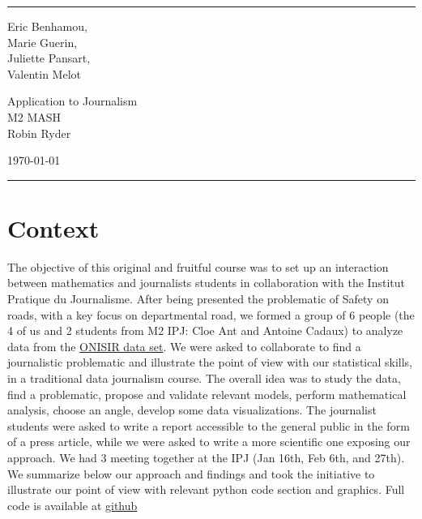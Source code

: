 \documentclass[a4paper]{article}
\theoremstyle{definition}
\theoremstyle{proposition}
\begin{document}

\fancyhead[C]{}
\hrule \medskip %
\begin{minipage}{0.295\textwidth} 
\raggedright
\footnotesize
Eric Benhamou, \hfill\\   
Marie Guerin, \hfill\\   
Juliette Pansart, \hfill\\
Valentin Melot  \hfill\\
\end{minipage}
\begin{minipage}{0.4\textwidth} 
\centering 
\large 
Application to Journalism\\ 
\normalsize 
M2 MASH \\ 
Robin Ryder
\end{minipage}
\begin{minipage}{0.295\textwidth} 
\raggedleft
\today\hfill\\
\end{minipage}
\medskip\hrule 
\bigskip


\section{Context}
The objective of this original and fruitful course was to set up an interaction between mathematics and journalists students in collaboration with the Institut Pratique du Journalisme. After being presented the problematic of Safety on roads, with a key focus on departmental road, we formed a group of 6 people (the 4 of us and 2 students from M2 IPJ: Cloe Ant and Antoine Cadaux) to analyze data from the \href{https://www.data.gouv.fr/fr/datasets/base-de-donnees-accidents-corporels-de-la-circulation/}{ONISIR data set}. We were asked to collaborate to find a journalistic problematic and illustrate the point of view with our statistical skills, in a traditional data journalism course. The overall idea was to study the data, find a problematic, propose and validate relevant models, perform mathematical analysis, choose an angle, develop some data visualizations. The journalist students were asked to write a report accessible to the general public in the form of a press article, while we were asked to write a more scientific one exposing our approach. We had 3 meeting together at the IPJ (Jan 16th, Feb 6th, and 27th). We summarize below our approach and findings and took the initiative to illustrate our point of view with relevant python code section and graphics. Full code is available at \href{https://github.com/ericbenhamou/MASH_IPJ_2018}{github}
\end{document}
